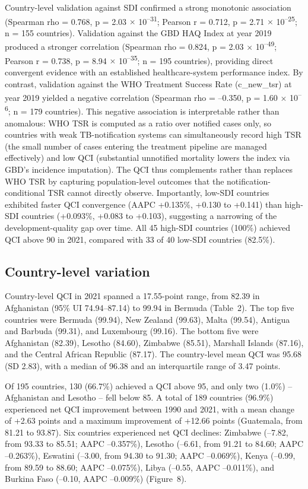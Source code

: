 \documentclass[12pt]{article}
\begin{document}
Country-level validation against SDI confirmed a strong monotonic association (Spearman rho = 0.768, p = 2.03 $\times$ 10\textsuperscript{--31}; Pearson r = 0.712, p = 2.71 $\times$ 10\textsuperscript{--25}; n = 155 countries). Validation against the GBD HAQ Index at year 2019 produced a stronger correlation (Spearman rho = 0.824, p = 2.03 $\times$ 10\textsuperscript{--49}; Pearson r = 0.738, p = 8.94 $\times$ 10\textsuperscript{--35}; n = 195 countries), providing direct convergent evidence with an established healthcare-system performance index. By contrast, validation against the WHO Treatment Success Rate (c\_new\_tsr) at year 2019 yielded a negative correlation (Spearman rho = --0.350, p = 1.60 $\times$ 10\textsuperscript{--6}; n = 179 countries). This negative association is interpretable rather than anomalous: WHO TSR is computed as a ratio over notified cases only, so countries with weak TB-notification systems can simultaneously record high TSR (the small number of cases entering the treatment pipeline are managed effectively) and low QCI (substantial unnotified mortality lowers the index via GBD's incidence imputation). The QCI thus complements rather than replaces WHO TSR by capturing population-level outcomes that the notification-conditional TSR cannot directly observe. Importantly, low-SDI countries exhibited faster QCI convergence (AAPC +0.135\%, +0.130 to +0.141) than high-SDI countries (+0.093\%, +0.083 to +0.103), suggesting a narrowing of the development-quality gap over time. All 45 high-SDI countries (100\%) achieved QCI above 90 in 2021, compared with 33 of 40 low-SDI countries (82.5\%).

\subsection{Country-level variation}

Country-level QCI in 2021 spanned a 17.55-point range, from 82.39 in Afghanistan (95\% UI 74.94--87.14) to 99.94 in Bermuda (Table~2). The top five countries were Bermuda (99.94), New Zealand (99.63), Malta (99.54), Antigua and Barbuda (99.31), and Luxembourg (99.16). The bottom five were Afghanistan (82.39), Lesotho (84.60), Zimbabwe (85.51), Marshall Islands (87.16), and the Central African Republic (87.17). The country-level mean QCI was 95.68 (SD 2.83), with a median of 96.38 and an interquartile range of 3.47 points.

Of 195 countries, 130 (66.7\%) achieved a QCI above 95, and only two (1.0\%) -- Afghanistan and Lesotho -- fell below 85. A total of 189 countries (96.9\%) experienced net QCI improvement between 1990 and 2021, with a mean change of +2.63 points and a maximum improvement of +12.66 points (Guatemala, from 81.21 to 93.87). Six countries experienced net QCI declines: Zimbabwe (--7.82, from 93.33 to 85.51; AAPC --0.357\%), Lesotho (--6.61, from 91.21 to 84.60; AAPC --0.263\%), Eswatini (--3.00, from 94.30 to 91.30; AAPC --0.069\%), Kenya (--0.99, from 89.59 to 88.60; AAPC --0.075\%), Libya (--0.55, AAPC --0.011\%), and Burkina Faso (--0.10, AAPC --0.009\%) (Figure~8).
\end{document}
